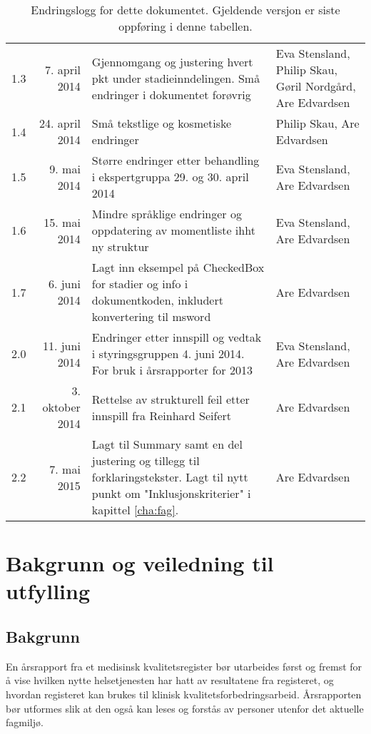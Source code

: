 \documentclass[norsk, a4paper, twocolumn]{report}
\begin{document}
\begin{table}[ht]
\begin{tabular}{lrp{8cm}p{2.5cm}}
    1.3 & 7. april 2014 & Gjennomgang og justering hvert pkt under
    stadieinndelingen. Små endringer i dokumentet forøvrig &
    Eva Stensland, Philip Skau, Gøril Nordgård, Are Edvardsen \\
    1.4 & 24. april 2014 & Små tekstlige og kosmetiske endringer &
    Philip Skau, Are Edvardsen \\
    1.5 & 9. mai 2014 & Større endringer etter behandling i ekspertgruppa
    29. og 30. april 2014 & Eva Stensland, Are Edvardsen \\
    1.6 & 15. mai 2014 & Mindre språklige endringer og oppdatering av
    momentliste ihht ny struktur & Eva Stensland, Are Edvardsen \\
    1.7 & 6. juni 2014 & Lagt inn eksempel på CheckedBox for stadier og info
    i dokumentkoden, inkludert konvertering til msword & Are Edvardsen \\
    2.0 & 11. juni 2014 & Endringer etter innspill og vedtak i styringsgruppen
    4. juni 2014. For bruk i årsrapporter for 2013 & Eva Stensland,
    Are Edvardsen \\
    2.1 & 3. oktober 2014 & Rettelse av strukturell feil etter innspill fra
    Reinhard Seifert & Are Edvardsen \\
    2.2 & 7. mai 2015 & Lagt til Summary samt en del justering og tillegg
    til forklaringstekster. Lagt til nytt punkt om "Inklusjonskriterier" i
    kapittel \ref{cha:fag}. & Are Edvardsen \\
    \hline
  \end{tabular}
  \caption{Endringslogg for dette dokumentet. Gjeldende versjon er siste
  oppføring i denne tabellen.}
  \label{tab:log}
\end{table}




\chapter*{Bakgrunn og veiledning til utfylling}


\section*{Bakgrunn}
En årsrapport fra et medisinsk kvalitetsregister bør utarbeides først og
fremst for å vise hvilken nytte helsetjenesten har hatt av resultatene fra
registeret, og
hvordan registeret kan brukes til klinisk kvalitetsforbedringsarbeid.
Årsrapporten bør utformes slik
at den også kan leses og forstås av personer utenfor det aktuelle fagmiljø.
\end{document}

